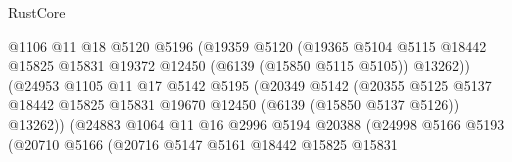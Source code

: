 \begin{lexlean}{RustCore}
\begin{coremodule}
                                      @1106
                                      @11
                                      @18
                                      @5120
                                      @5196
                                      (@19359
                                        @5120
                                        (@19365
                                          @5104
                                          @5115
                                          @18442
                                          @15825
                                          @15831
                                          @19372
                                          @12450
                                          (@6139 (@15850 @5115 @5105))
                                          @13262))
                                      (@24953
                                        @1105
                                        @11
                                        @17
                                        @5142
                                        @5195
                                        (@20349
                                          @5142
                                          (@20355
                                            @5125
                                            @5137
                                            @18442
                                            @15825
                                            @15831
                                            @19670
                                            @12450
                                            (@6139 (@15850 @5137 @5126))
                                            @13262))
                                        (@24883
                                          @1064
                                          @11
                                          @16
                                          @2996
                                          @5194
                                          @20388
                                          (@24998
                                            @5166
                                            @5193
                                            (@20710
                                              @5166
                                              (@20716
                                                @5147
                                                @5161
                                                @18442
                                                @15825
                                                @15831

\end{coremodule}
\end{lexlean}
